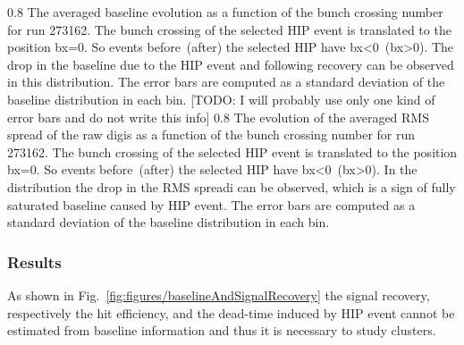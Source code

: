                  {0.8}       %
                 {The averaged baseline evolution as a function of the bunch crossing number for run 273162. The bunch crossing of the selected HIP event is translated to the position bx=0. So events before~(after) the selected HIP have bx<0~(bx>0). The drop in the baseline due to the HIP event and following recovery can be observed in this distribution. The error bars are computed as a standard deviation of the baseline distribution in each bin. [TODO: I will probably use only one kind of error bars and do not write this info]  } %
                 {0.8}       %
                 {The evolution of the averaged RMS spread of the raw digis as a function of the bunch crossing number for run 273162. The bunch crossing of the selected HIP event is translated to the position bx=0. So events before~(after) the selected HIP have bx<0~(bx>0). In the distribution the drop in the RMS spreadi can be observed, which is a sign of fully saturated baseline caused by HIP event. The error bars are computed as a standard deviation of the baseline distribution in each bin.  } %

\subsubsection{Results}

As shown in Fig.~\ref{fig:figures/baselineAndSignalRecovery} the signal recovery, respectively the hit efficiency, and the dead-time  induced by HIP event cannot be estimated from baseline information and thus it is necessary to study clusters.

